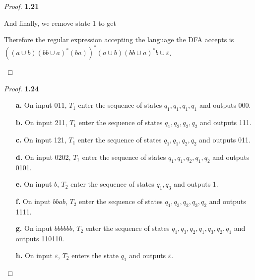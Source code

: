 \documentclass[11pt]{article}
\theoremstyle{definition}
\begin{document}
\begin{proof}{\textbf{1.21}}
\begin{itemize}
\begin{figure}[H]
    \end{figure}
    And finally, we remove state 1 to get
    \begin{figure}[H]
        \centering
    \end{figure}
    Therefore the regular expression accepting the language the DFA accepts
    is $((a\cup b)(bb \cup a)^*(ba))^*(a\cup b)(bb \cup a)^*b\cup\varepsilon$.
\end{itemize}
\end{proof}
\cleardoublepage
\begin{proof}{\textbf{1.24}}
\begin{itemize}
    \item [\textbf{a.}] On input 011, $T_1$ enter the sequence of states
    $q_1,q_1,q_1,q_1$  and outputs 000.
    \item [\textbf{b.}] On input 211, $T_1$ enter the sequence of states
    $q_1,q_2,q_2,q_2$ and outputs 111.
    \item [\textbf{c.}] On input 121, $T_1$ enter the sequence of states
    $q_1,q_1,q_2,q_2$ and outputs 011.
    \item [\textbf{d.}] On input 0202, $T_1$ enter the sequence of states
    $q_1,q_1,q_2,q_1,q_2$ and outputs 0101.
    \item [\textbf{e.}] On input $b$, $T_2$ enter the sequence of states
    $q_1,q_3$ and outputs 1.
    \item [\textbf{f.}] On input $bbab$, $T_2$ enter the sequence of states
    $q_1,q_3,q_2,q_3,q_2$ and outputs 1111.
    \item [\textbf{g.}] On input $bbbbbb$, $T_2$ enter the sequence of states
    $q_1,q_3,q_2,q_1,q_3,q_2,q_1$ and outputs 110110.
    \item [\textbf{h.}] On input $\varepsilon$, $T_2$ enters the
    state $q_1$ and outputs $\varepsilon$.
\end{itemize}
\end{proof}
\end{document}
